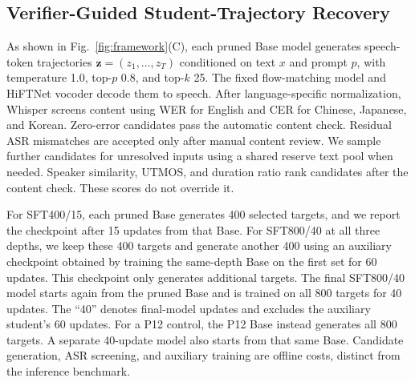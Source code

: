\documentclass{article}
\begin{document}
\subsection{Verifier-Guided Student-Trajectory Recovery}
\label{sec:verifier_recovery}

As shown in Fig.~\ref{fig:framework}(C), each pruned Base model generates
speech-token trajectories $\mathbf{z}=(z_1,\ldots,z_T)$ conditioned on
text $x$ and prompt $p$, with temperature 1.0, top-$p$ 0.8, and
top-$k$ 25. The fixed flow-matching model and HiFTNet
vocoder decode them to speech. After language-specific normalization,
Whisper screens content using WER for English and CER for Chinese,
Japanese, and Korean. Zero-error candidates pass the automatic content
check. Residual ASR mismatches are accepted only after manual content
review. We sample further candidates for unresolved inputs using a
shared reserve text pool when needed. Speaker similarity, UTMOS, and
duration ratio rank candidates after the content check. These scores
do not override it.

For SFT400/15, each pruned Base generates 400 selected targets, and
we report the checkpoint after 15 updates from that Base. For
SFT800/40 at all three depths, we keep these 400 targets and
generate another 400 using an auxiliary checkpoint obtained by
training the same-depth Base on the first set for 60 updates. This
checkpoint only generates additional targets. The final SFT800/40
model starts again from the pruned Base and is trained on all 800
targets for 40 updates.
The ``40'' denotes final-model updates and excludes the auxiliary
student's 60 updates.
For a P12 control, the P12 Base instead generates all 800 targets.
A separate 40-update model also starts from that same Base.
Candidate generation, ASR screening, and auxiliary training are
offline costs, distinct from the inference benchmark.
\end{document}

